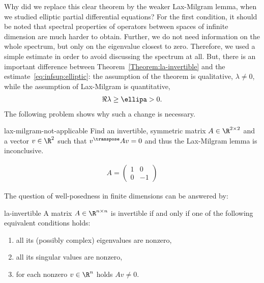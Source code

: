 \begin{intro}
  Why did we replace this clear theorem by the weaker Lax-Milgram
  lemma, when we studied elliptic partial differential equations?  For
  the first condition, it should be noted that spectral properties of
  operators between spaces of infinite dimension are much harder to
  obtain. Further, we do not need information on the whole spectrum,
  but only on the eigenvalue closest to zero. Therefore, we used a
  simple estimate in order to avoid discussing the spectrum at
  all. But, there is an important difference between
  Theorem~\ref{Theorem:la-invertible} and the
  estimate~\eqref{eq:infsup:elliptic}: the assumption of the theorem
  is qualitative, $\lambda \neq 0$, while the assumption of Lax-Milgram
  is quantitative,
  \begin{gather}
    \Re\lambda \ge \ellipa> 0.
  \end{gather}
  The following problem shows why such a change is necessary.
\end{intro}


\begin{Problem}{lax-milgram-not-applicable}
  Find an invertible, symmetric matrix $A\in \R^{2\times 2}$ and a
  vector $v\in \R^2$ such that $v^\transpose A v=0$ and thus the Lax-Milgram
  lemma is inconclusive.
\begin{solution}
  \begin{gather}
    A =
    \begin{pmatrix}
      1 & 0 \\ 0 & -1
    \end{pmatrix}
  \end{gather}
\end{solution}
\end{Problem}

The question of well-posedness in finite dimensions can be answered by:

\begin{Theorem}{la-invertible}
  A matrix $A\in\R^{n\times n}$ is invertible if and only if one of
  the following equivalent conditions holds:
  \begin{enumerate}
  \item all its (possibly complex) eigenvalues are nonzero,
  \item all its singular values are nonzero,
  \item for each nonzero $v\in\R^n$ holds $Av\neq 0$.
  \end{enumerate}
\end{Theorem}

